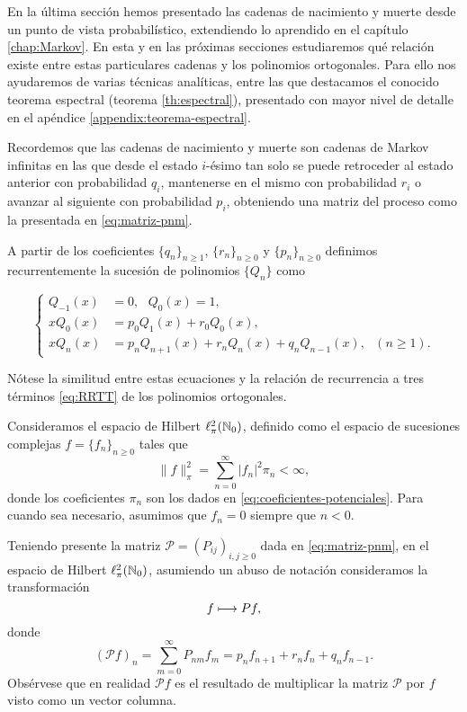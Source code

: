     En la última sección hemos presentado las cadenas de nacimiento y muerte desde un punto de vista probabilístico, extendiendo lo aprendido en el capítulo \ref{chap:Markov}. En esta y en las próximas secciones estudiaremos qué relación existe entre estas particulares cadenas y los polinomios ortogonales. Para ello nos ayudaremos de varias técnicas analíticas, entre las que destacamos el conocido teorema espectral (teorema \ref{th:espectral}), presentado con mayor nivel de detalle en el apéndice \ref{appendix:teorema-espectral}.
    
    Recordemos que las cadenas de nacimiento y muerte son cadenas de Markov infinitas en las que desde el estado $i$-ésimo tan solo se puede retroceder al estado anterior con probabilidad $q_i$, mantenerse en el mismo con probabilidad $r_i$ o avanzar al siguiente con probabilidad $p_i$, obteniendo una matriz del proceso como la presentada en \eqref{eq:matriz-pnm}.

    A partir de los coeficientes $\{q_n\}_{n\geq 1}$, $\{r_n\}_{n\geq 0}$ y $\{p_n\}_{n\geq 0}$ definimos recurrentemente la sucesión de polinomios $\{Q_n\}$ como

    \begin{equation}
        \label{eq:polinomios-pnm}
        \left\{\begin{aligned}
            Q_{-1}(x) &= 0, \ \ \ Q_0(x)=1, \\
            xQ_0(x)&=p_0 Q_1(x) + r_0 Q_0(x), \\
            x Q_n(x)&= p_n Q_{n+1}(x) + r_n Q_n(x) + q_n Q_{n-1}(x), \ \ \ (n\geq 1).
        \end{aligned}\right.
    \end{equation}
    
    Nótese la similitud entre estas ecuaciones y la relación de recurrencia a tres términos \eqref{eq:RRTT} de los polinomios ortogonales. 

    Consideramos el espacio de Hilbert $\ell^2_\pi(\mathbb{N}_0)$, definido como el espacio de sucesiones complejas $f=\{f_n\}_{n\geq 0}$ tales que 
    $$
    \|f\|_\pi^2=\sum_{n=0}^\infty |f_n|^2\pi_n <\infty,
    $$
    donde los coeficientes $\pi_n$ son los dados en \eqref{eq:coeficientes-potenciales}. Para cuando sea necesario, asumimos que $f_n=0$ siempre que $n<0$.

    Teniendo presente la matriz $\mathcal P=\left(P_{ij}\right)_{i,j\geq 0}$ dada en \eqref{eq:matriz-pnm}, en el espacio de Hilbert $\ell^2_\pi(\mathbb{N}_0)$, asumiendo un abuso de notación consideramos la transformación
    \begin{equation}
        \label{eq:operador-P}
        f \longmapsto \mathcal \mathcal P f,
    \end{equation}
    donde
    $$
    (\mathcal P f)_n = \sum_{m=0}^\infty P_{nm} f_m = p_n f_{n+1} + r_n f_n + q_n f_{n-1}. 
    $$
    Obsérvese que en realidad $\mathcal P f$ es el resultado de multiplicar la matriz $\mathcal P$ por $f$ visto como un vector columna.

